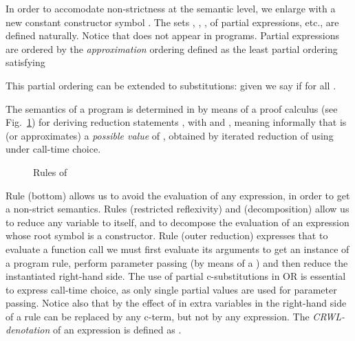 \documentclass{llncs}
\begin{document}
In order to accomodate non-strictness at the semantic level, we
enlarge  with a new constant constructor symbol . The
sets , , ,  of
partial expressions, etc., are defined naturally. Notice that 
does not appear in programs. Partial expressions are ordered by the
\emph{approximation} ordering  defined as the least
partial ordering satisfying

This partial ordering can be extended to substitutions: given
 we say  if
 for all .

The semantics of a program  is determined in \crwl{} by
means of a proof calculus (see Fig.~\ref{fig:crwl}) for deriving
reduction statements , with 
and , meaning informally that  is (or
approximates) a \emph{possible value} of , obtained by iterated
reduction of  using  under call-time choice.
\begin{figure}[tbp]\begin{center}
\end{center}
    \caption{Rules of \crwl}
    \label{fig:crwl}
\end{figure}
Rule  (bottom) allows us to avoid the evaluation of any
expression, in order to get a non-strict semantics. Rules 
(restricted reflexivity) and  (decomposition) allow us to
reduce any variable to itself, and to decompose the evaluation of an
expression whose root symbol is a constructor. Rule  (outer
reduction) expresses that to evaluate a function call we must first
evaluate its arguments to get an instance of a program rule, perform
parameter passing (by means of a  ) and then
reduce the instantiated right-hand side. The use of partial
c-substitutions in {OR} is essential to express call-time choice, as
only single partial values are used for parameter passing. Notice also
that by the effect of  in  extra variables in the
right-hand side of a rule can be replaced by any c-term, but not by
any expression.
The \emph{CRWL-denotation} of an expression  is
defined as .
\end{document}
